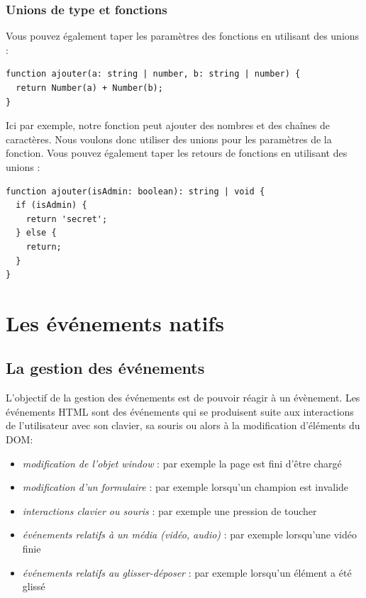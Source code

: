 \documentclass{article}
\begin{document}
\subsubsection{Unions de type et fonctions}
Vous pouvez également taper les paramètres des fonctions en utilisant des unions :
\begin{verbatim}
function ajouter(a: string | number, b: string | number) {
  return Number(a) + Number(b);
}
\end{verbatim}

Ici par exemple, notre fonction peut ajouter des nombres et des chaînes de caractères. Nous voulons donc utiliser des unions pour les paramètres de la fonction. Vous pouvez également taper les retours de fonctions en utilisant des unions :
\begin{verbatim}
function ajouter(isAdmin: boolean): string | void {
  if (isAdmin) {
    return 'secret';
  } else {
    return;
  }
}
\end{verbatim}



\section{Les événements natifs}
\subsection{La gestion des événements}
L'objectif de la gestion des événements est de pouvoir réagir à un évènement. Les événements HTML sont des événements qui se produisent suite aux interactions de l'utilisateur avec son clavier, sa souris ou alors à la modification d'éléments du DOM:
\begin{itemize}
\item {\em modification de l'objet {\color{monOrange}window}} : par exemple la page est fini d'être chargé
\item {\em modification d'un formulaire }: par exemple lorsqu'un champion est invalide
\item {\em interactions clavier ou souris }: par exemple une pression de toucher
\item {\em événements relatifs à un média (vidéo, audio) }: par exemple lorsqu'une vidéo finie
\item {\em événements relatifs au glisser-déposer }: par exemple lorsqu'un élément a été glissé
\end{itemize}
\end{document}
